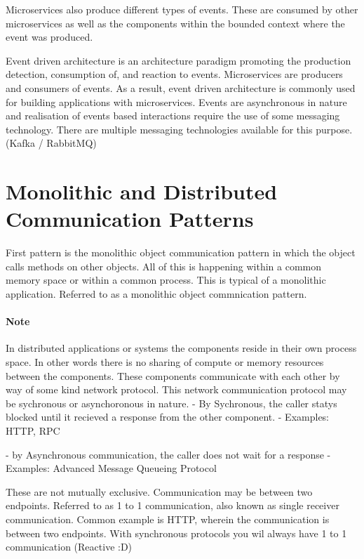 \documentclass[a4paper, 11pt]{book}
\begin{document}
{    Microservices also produce different types of events.
    These are consumed by other microservices as well as the components within the bounded context where the event was produced.

    Event driven architecture is an architecture paradigm promoting the production detection, consumption of, and reaction to events.
    Microservices are producers and consumers of events.
    As a result, event driven architecture is commonly used for building applications with microservices.
    Events are asynchronous in nature and realisation of events based interactions require the use of some messaging technology.
    There are multiple messaging technologies available for this purpose. (Kafka / RabbitMQ) %

    \section{Monolithic and Distributed Communication Patterns}
    First pattern is the monolithic object communication pattern in which the object calls methods on other objects.
    All of this is happening within a common memory space or within a common process.
    This is typical of a monolithic application. Referred to as a monolithic object commnication pattern.

    \paragraph{Note}
    In distributed applications or systems the components reside in their own process space.
    In other words there is no sharing of compute or memory resources between the components.
    These components communicate with each other by way of some kind network protocol.
    This network communication protocol may be sychronous or asynchoronous in nature.
    - By Sychronous, the caller statys blocked until it recieved a response from the other component.
    - Examples: HTTP, RPC

    - by Asynchronous communication, the caller does not wait for a response
    - Examples: Advanced Message Queueing Protocol

    These are not mutually exclusive.
    Communication may be between two endpoints.
    Referred to as 1 to 1 communication, also known as single receiver communication.
    Common example is HTTP, wherein the communication is between two endpoints.
    With synchronous protocols you wil always have 1 to 1 communication (Reactive :D)

}
\end{document}
